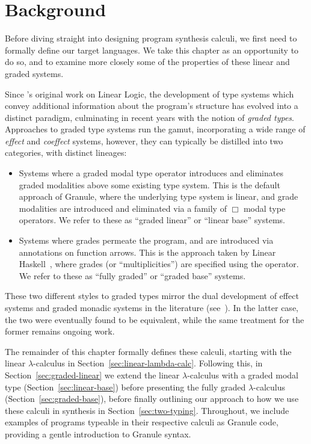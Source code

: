 \chapter{Background}
\label{chapter:background}
Before diving straight into designing program synthesis calculi, we first need
to formally define our target languages. We take
this chapter as an opportunity to do so, and to examine more closely some
of the properties of these linear and graded systems. 

Since \citet{girard1987linear}'s original work on Linear Logic, the development
of type systems which convey additional information about the program's
structure has evolved into a distinct paradigm, culminating in recent years with
the notion of \textit{graded types}. Approaches to graded type systems run the
gamut, incorporating a wide range of \emph{effect} and \emph{coeffect} systems,
however, they can typically be distilled into two categories, with distinct
lineages: 
\begin{itemize}
  \item Systems where a graded modal type operator introduces and eliminates
        graded modalities above some existing type system. This is the default
        approach of Granule, where the underlying type system is linear, and
        grade modalities are introduced and eliminated via a family of $\Box$
        modal type operators. We refer to these as ``graded linear'' or ``linear
        base'' systems.
  \item Systems where grades permeate the program, and are introduced via
        annotations on function arrows. This is the approach taken by Linear
        Haskell~\citep{DBLP:journals/pacmpl/BernardyBNJS18}, where grades (or
        ``multiplicities'') are specified using the \granin{\%} operator. We
        refer to these as ``fully graded'' or ``graded base'' systems.
\end{itemize}  
These two different styles to graded types mirror the dual development of effect
systems and graded monadic systems in the literature
(see~\citet{10.1145/601775.601776}). In the latter case, the two were eventually
found to be equivalent, while the same treatment for the former remains ongoing
work. 

The remainder of this chapter formally defines these calculi, starting with the
linear $\lambda$-calculus in Section~\ref{sec:linear-lambda-calc}. Following
this, in Section~\ref{sec:graded-linear} we extend the linear $\lambda$-calculus
with a graded modal type (Section~\ref{sec:linear-base}) before presenting the
fully graded $\lambda$-calculus (Section~\ref{sec:graded-base}), before finally
outlining our approach to how we use these calculi in synthesis in
Section~\ref{sec:two-typing}. Throughout, we include examples of programs
typeable in their respective calculi as Granule code, providing a gentle
introduction to Granule syntax. 

